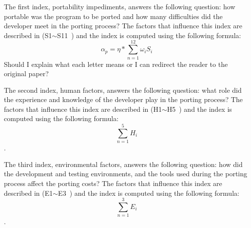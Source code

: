 The first index, portability impediments, answers the following question: how
portable was the program to be ported and how many difficulties did the
developer meet in the porting process? The factors that influence this index are
described in (S1$\sim$S11~\cite{b2}) and the index is computed using the
following formula: \[ \alpha_p = \eta * \sum_{n=1}^{12} \omega_i S_i \]
{\color{red} Should I explain what each letter means or I can redirect the
reader to the original paper?}

The second index, human factors, answers the following question: what role did
the experience and knowledge of the developer play in the porting process? The
factors that influence this index are described in (H1$\sim$H5~\cite{b2}) and
the index is computed using the following formula: \[ \sum_{n=1}^{5} H_i \].

The third index, environmental factors, answers the following question: how did
the development and testing environments, and the tools used during the porting
process affect the porting costs? The factors that influence this index are
described in (E1$\sim$E3~\cite{b2}) and the index is computed using the
following formula: \[ \sum_{n=1}^{3} E_i \].
